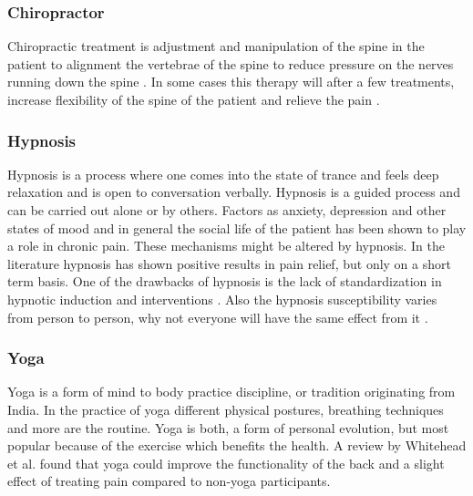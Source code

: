 \subsubsection{Chiropractor}
Chiropractic treatment is adjustment and manipulation of the spine in the patient to alignment the vertebrae of the spine to reduce pressure on the nerves running down the spine \cite{Gerald2013}. In some cases this therapy will after a few treatments, increase flexibility of the spine of the patient and relieve the pain \cite{Peterson2012}.

\subsubsection{Hypnosis}
Hypnosis is a process where one comes into the state of trance and feels deep relaxation and is open to conversation verbally. Hypnosis is a guided process and can be carried out alone or by others. \cite{Gerald2013} Factors as anxiety, depression and other states of mood and in general the social life of the patient has been shown to play a role in chronic pain. These mechanisms might be altered by hypnosis.
In the literature hypnosis has shown positive results in pain relief, but only on a short term basis. \cite{Dhanani2011}
One of the drawbacks of hypnosis is the lack of standardization in hypnotic induction and interventions \cite{Alkins2010}. Also the hypnosis susceptibility  varies from person to person, why not everyone will have the same effect from it \cite{Spiegel2013}.

\subsubsection{Yoga}
Yoga is a form of mind to body practice discipline, or tradition originating from India. In the practice of yoga different physical postures, breathing techniques and more are the routine. 
Yoga is both, a form of personal evolution, but most popular because of the exercise which benefits the health. \cite{Whitehead2017}
A review by Whitehead et al. \cite{Whitehead2017} found that yoga could improve the functionality of the back and a slight effect of treating pain compared to non-yoga participants. 

